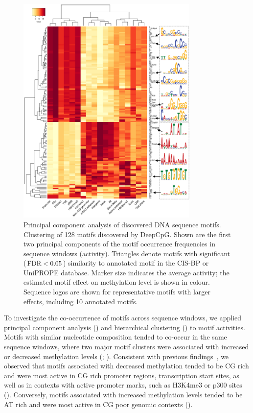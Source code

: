 \begin{figure}[htbp!]
\centering
\includegraphics[width=0.8\textwidth]{motifs_act}
\caption[Principal component analysis of discovered DNA sequence motifs.]{Principal component analysis of discovered DNA sequence motifs. Clustering of 128 motifs discovered by DeepCpG. Shown are the first two principal components of the motif occurrence frequencies in sequence windows (activity). Triangles denote motifs with significant ($\operatorname{FDR}<0.05$) similarity to annotated motif in the CIS-BP or UniPROPE database. Marker size indicates the average activity; the estimated motif effect on methylation level is shown in colour. Sequence logos are shown for representative motifs with larger effects, including 10 annotated motifs.}
\label{fig:dcpg_motifs_act}
\end{figure}

To investigate the co-occurrence of motifs across sequence windows, we applied principal component analysis () and hierarchical clustering () to motif activities.  Motifs with similar nucleotide composition tended to co-occur in the same sequence windows, where two major motif clusters were associated with increased or decreased methylation levels (; ). Consistent with previous findings~\citep{mendenhall_gc-rich_2010,thomson_cpg_2010,whitaker_predicting_2015}, we observed that motifs associated with decreased methylation tended to be CG rich and were most active in CG rich promoter regions, transcription start sites, as well as in contexts with active promoter marks, such as H3K4me3 or p300 sites (). Conversely, motifs associated with increased methylation levels tended to be AT rich and were most active in CG poor genomic contexts ().

